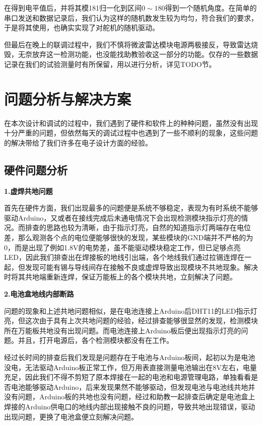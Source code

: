\documentclass[a4paper, 11pt]{article} %
\begin{document}
在得到电平值后，并将其模181归一化到区间$0 \sim 180$得到一个随机角度。在简单的串口发送和数据记录后，我们认为这样的随机数发生较为均匀，符合我们的要求，于是将其使用，也确实实现了对舵机的随机驱动。

但最后在晚上的联调过程中，我们不慎将微波雷达模块电源两极接反，导致雷达烧毁，无奈放弃这一检测功能，也没能找助教验收这一部分的功能。仅存的一些数据记录在我们的试验测量时有所保留，用以进行分析，详见TODO节。

\section{问题分析与解决方案}

\par{} 在本次设计和调试的过程中，我们遇到了硬件和软件上的种种问题，虽然没有出现十分严重的问题，但依然每天的调试过程中也遇到了一些不顺利的现象，这些问题的解决带给了我们许多在电子设计方面的经验。



\subsection{硬件问题分析}

\par{} \textbf{1.虚焊共地问题}
\par{}首先在硬件方面，我们出现最多的问题便是系统不够稳定，表现为有时系统不能够驱动Arduino，又或者在接线完成后未通电情况下会出现检测模块指示灯亮的情况。而排查的思路也较为清晰，由于指示灯亮，自然的知道指示灯两端存在电位差，那么观测各个点的电位便能够很快的发现，某些模块的GND端并不严格的为0，而是出现了例如1.8V的电势差，虽不能驱动模块稳定工作，但已足够点亮LED，因此我们排查出在焊接板的地线引出端，各个地线我们通过拉锡连焊在一起，但发现可能有锡与导线间存在接触不良或虚焊导致出现模块不共地现象。解决时将其共地端重新连焊，保证万能板上的各个模块共地，立刻解决了问题。

\par{} \textbf{2.电池盒地线内部断路}

\par{} 问题的现象和上述共地问题相似，是在电池连接上Arduino后DHT11的LED指示灯亮，但这次由于具有上次共地问题的经验，经过排查能够很显然的发现，检测模块所在万能板共地没有出现问题。而电池连接上Arduino板后便出现指示灯亮的问题。并且，打开电源后，各个检测模块都没有在工作。
\par{}经过长时间的排查后我们发现是问题存在于电池与Arduino板间，起初以为是电池没电，无法驱动Arduino板正常工作，但万用表直接测量电池输出在8V左右，电量充足，因此我们不得不剪短了原本焊接在一起的电池和电源管理电路，单独看看是否电池能够驱动Arduino，后来发现果然不能够驱动，但发现电池与电池线共地并没有问题，Arduino板的共地也没有问题，经过和助教一起排查后确定是电池盒上焊接的Arduino供电口的地线内部出现接触不良的问题，导致共地出现错误，驱动出现问题，更换了电池盒便立刻解决问题。
\end{document}
